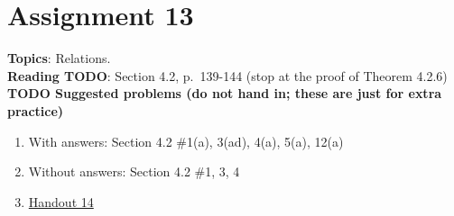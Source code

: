 \documentclass[12pt]{article}
\begin{document}



\newpage
\section[13 (due \csname dateWeek13\endcsname): Binary Operations and Bijections/Countability]{Assignment 13}

\textbf{Topics}: Relations.
\\

\noindent \textbf{Reading TODO}: Section 4.2, p.~139-144 (stop at the proof of Theorem 4.2.6)
\\



\noindent \textbf{TODO Suggested problems (do not hand in; these are just for extra practice)}

\begin{enumerate}
\item With answers: Section 4.2 \#1(a), 3(ad), 4(a), 5(a), 12(a)
\item Without answers: Section 4.2 \#1, 3, 4
\item \href{https://www.math.emory.edu/~dzb/teaching/250Fall2021/handouts/250-H14-equivalence-relations.pdf}{Handout 14}
\end{enumerate}
\end{document}
